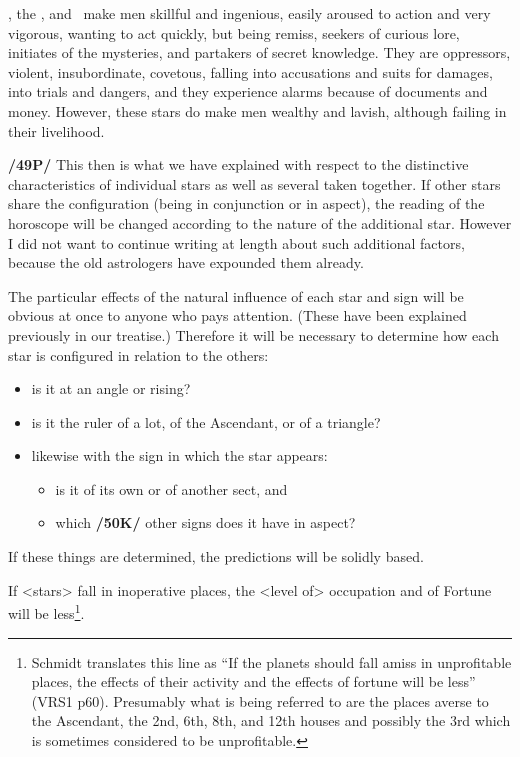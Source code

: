 \Mars, the \Moon, and \Mercury\, make men skillful and ingenious, easily aroused to action and very vigorous, wanting to act quickly, but being remiss, seekers of curious lore, initiates of the mysteries, and partakers of secret knowledge. They are oppressors, violent, insubordinate, covetous, falling into accusations and suits for damages, into trials and dangers, and they experience alarms because of documents and money. However, these stars do make men wealthy and lavish, although failing in their livelihood. 

\textbf{/49P/} This then is what we have explained with respect to the distinctive characteristics of individual stars as well as several taken together. If other stars share the configuration (being in conjunction or in aspect), the reading of the horoscope will be changed according to the nature of the additional star. However I did not want to continue writing at length about such additional factors, because the old astrologers have expounded them already. 

\mndl[0.2cm]
The particular effects of the natural influence of each star and sign will be obvious at once to anyone who pays attention. (These have been explained previously in our treatise.) Therefore it will be necessary to determine how each star is configured in relation to the others: 
\begin{itemize}
\item is it at an angle or rising? 
\item is it the ruler of a lot, of the Ascendant, or of a triangle? 
\item likewise with the sign in which the star appears: 
\begin{itemize}
\item is it of its own or of another sect, and 
\item which \textbf{/50K/} other signs does it have in aspect? 
\end{itemize}
\end{itemize}

If these things are determined, the predictions will be solidly based. 

If <stars> fall in inoperative places, the <level of> occupation and of Fortune will be less\footnote{Schmidt translates this line as ``If the planets should fall amiss in unprofitable places, the effects of their activity and the effects of fortune will be less'' (VRS1 p60). Presumably what is being referred to are the places averse to the Ascendant, the 2nd, 6th, 8th, and 12th houses and possibly the 3rd which is sometimes considered to be unprofitable.}.

\newpage